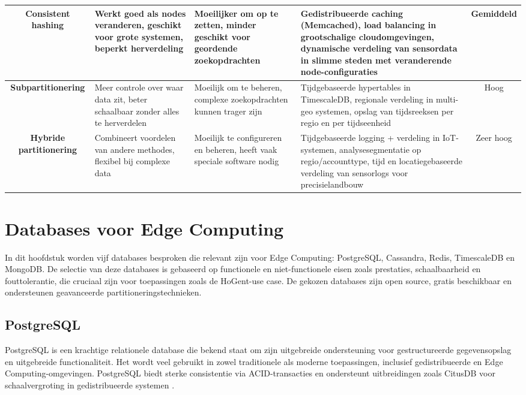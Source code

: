 \begin{table}[H]
{\begin{tabular}{|c|p{4.2cm}|p{4.5cm}|p{4.5cm}|c|}
    \textbf{Consistent hashing} & 
    Werkt goed als nodes veranderen, geschikt voor grote systemen, beperkt herverdeling & 
    Moeilijker om op te zetten, minder geschikt voor geordende zoekopdrachten & 
    Gedistribueerde caching (Memcached), load balancing in grootschalige cloudomgevingen, dynamische verdeling van sensordata in slimme steden met veranderende node-configuraties & 
    Gemiddeld \\ \hline

    \textbf{Subpartitionering} & 
    Meer controle over waar data zit, beter schaalbaar zonder alles te herverdelen & 
    Moeilijk om te beheren, complexe zoekopdrachten kunnen trager zijn & 
    Tijdgebaseerde hypertables in TimescaleDB, regionale verdeling in multi-geo systemen, opslag van tijdsreeksen per regio en per tijdseenheid & 
    Hoog \\ \hline

    \textbf{Hybride partitionering} & 
    Combineert voordelen van andere methodes, flexibel bij complexe data & 
    Moeilijk te configureren en beheren, heeft vaak speciale software nodig & 
    Tijdgebaseerde logging + verdeling in IoT-systemen, analysesegmentatie op regio/accounttype, tijd en locatiegebaseerde verdeling van sensorlogs voor precisielandbouw & 
    Zeer hoog \\ \hline

    \end{tabular}%
    }
\end{table}

\noindent

\section{Databases voor Edge Computing}

In dit hoofdstuk worden vijf databases besproken die relevant zijn voor Edge Computing: PostgreSQL, Cassandra, Redis, TimescaleDB en MongoDB.
 De selectie van deze databases is gebaseerd op functionele en niet-functionele eisen zoals prestaties, schaalbaarheid en fouttolerantie, die cruciaal zijn voor toepassingen zoals de HoGent-use case. 
De gekozen databases zijn open source, gratis beschikbaar en ondersteunen geavanceerde partitioneringstechnieken.

\subsection{PostgreSQL}

PostgreSQL is een krachtige relationele database die bekend staat om zijn uitgebreide ondersteuning voor gestructureerde gegevensopslag en uitgebreide functionaliteit. Het wordt veel gebruikt in zowel traditionele als moderne toepassingen, inclusief gedistribueerde en Edge Computing-omgevingen. PostgreSQL biedt sterke consistentie via ACID-transacties en ondersteunt uitbreidingen zoals CitusDB voor schaalvergroting in gedistribueerde systemen \autocite{Kleppmann2017, PostgreSQLDocumentation}.

